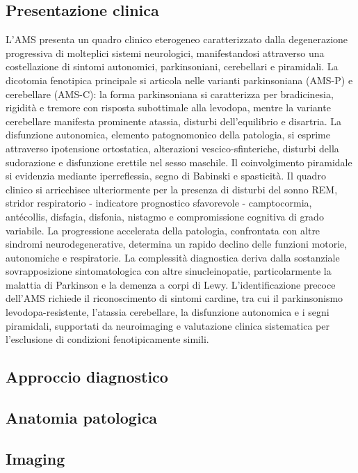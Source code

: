 \subsection{Presentazione  clinica}
L'AMS presenta un quadro clinico eterogeneo caratterizzato dalla degenerazione progressiva di molteplici sistemi neurologici, manifestandosi attraverso una costellazione di sintomi autonomici, parkinsoniani, cerebellari e piramidali. La dicotomia fenotipica principale si articola nelle varianti parkinsoniana (AMS-P) e cerebellare (AMS-C): la forma parkinsoniana si caratterizza per bradicinesia, rigidità e tremore con risposta subottimale alla levodopa, mentre la variante cerebellare manifesta prominente atassia, disturbi dell'equilibrio e disartria. La disfunzione autonomica, elemento patognomonico della patologia, si esprime attraverso ipotensione ortostatica, alterazioni vescico-sfinteriche, disturbi della sudorazione e disfunzione erettile nel sesso maschile. Il coinvolgimento piramidale si evidenzia mediante iperreflessia, segno di Babinski e spasticità. Il quadro clinico si arricchisce ulteriormente per la presenza di disturbi del sonno REM, stridor respiratorio - indicatore prognostico sfavorevole - camptocormia, antécollis, disfagia, disfonia, nistagmo e compromissione cognitiva di grado variabile. La progressione accelerata della patologia, confrontata con altre sindromi neurodegenerative, determina un rapido declino delle funzioni motorie, autonomiche e respiratorie. La complessità diagnostica deriva dalla sostanziale sovrapposizione sintomatologica con altre sinucleinopatie, particolarmente la malattia di Parkinson e la demenza a corpi di Lewy. L'identificazione precoce dell'AMS richiede il riconoscimento di sintomi cardine, tra cui il parkinsonismo levodopa-resistente, l'atassia cerebellare, la disfunzione autonomica e i segni piramidali, supportati da neuroimaging e valutazione clinica sistematica per l'esclusione di condizioni fenotipicamente simili.

\subsection{Approccio diagnostico}

\subsection{Anatomia patologica}

\subsection{Imaging}

